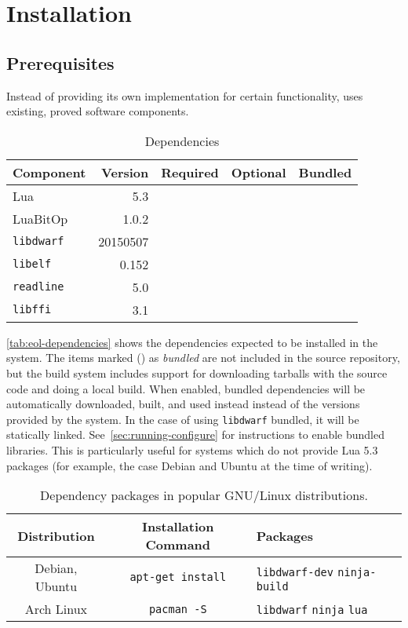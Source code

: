 
\chapter{Installation}

\section{Prerequisites}
\label{sec:eol-prereqs}

Instead of providing its own implementation for certain functionality, \Eol*
uses existing, proved software components.

\begin{table}[h]
	\centering
	\begin{tabular}{lrccc}
		\toprule
		Component & Version  & Required & Optional & Bundled \\
		\midrule
		Lua             & 5.3      & \Tick &       & \Tick \\
		LuaBitOp        & 1.0.2    &       & \Tick & \Tick \\
		\verb|libdwarf| & 20150507 & \Tick &       & \Tick \\
		\verb|libelf|   & 0.152    & \Tick &       & \\
		\verb|readline| & 5.0      &       & \Tick & \\
		\verb|libffi|   & 3.1      &       & \Tick & \\
		\bottomrule
	\end{tabular}
	\caption{Dependencies}
	\label{tab:eol-dependencies}
\end{table}

\autoref{tab:eol-dependencies} shows the dependencies expected to be
installed in the system. The items marked (\inlinesymbol\Tick) as
\emph{bundled} are not included in the source repository, but the build system
includes support for downloading tarballs with the source code and doing
a local build. When enabled, bundled dependencies will be automatically
downloaded, built, and used instead instead of the versions provided by the
system. In the case of using \verb|libdwarf| bundled, it will be statically
linked. See~\autoref{sec:running-configure} for instructions to enable
bundled libraries. This is particularly useful for systems which do not
provide Lua 5.3 packages (for example, the case Debian and Ubuntu at the time
of writing).

\begin{table}
  \begin{tabular}{ccp{}}
  \toprule
	Distribution & Installation Command & Packages \\
	\midrule
	Debian, Ubuntu &
    \verb|apt-get install| &
    \verb|libdwarf-dev| \verb|ninja-build| \\
	Arch Linux & \verb|pacman -S| & \verb|libdwarf| \verb|ninja| \verb|lua| \\
	\bottomrule
  \end{tabular}
  \caption{Dependency packages in popular GNU/Linux distributions.}
  \label{tab:distro-dependency-packages}
\end{table}

